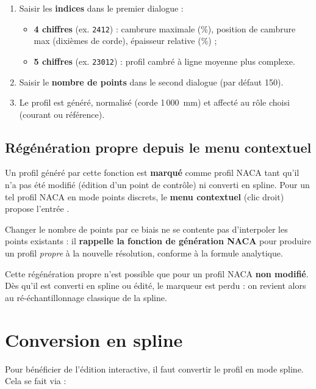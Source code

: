 \begin{enumerate}
    \item Saisir les \textbf{indices} dans le premier dialogue :
        \begin{itemize}
            \item \textbf{4 chiffres} (ex. \texttt{2412}) : cambrure
                maximale (\%), position de cambrure max (dixièmes de
                corde), épaisseur relative (\%) ;
            \item \textbf{5 chiffres} (ex. \texttt{23012}) : profil
                cambré à ligne moyenne plus complexe.
        \end{itemize}
    \item Saisir le \textbf{nombre de points} dans le second
        dialogue (par défaut 150).
    \item Le profil est généré, normalisé (corde 1\,000~mm) et
        affecté au rôle choisi (courant ou référence).
\end{enumerate}

\subsection{Régénération propre depuis le menu contextuel}

Un profil généré par cette fonction est \textbf{marqué} comme
profil NACA tant qu'il n'a pas été modifié (édition d'un point de
contrôle) ni converti en spline. Pour un tel profil NACA en mode
points discrets, le \textbf{menu contextuel} (clic droit) propose
l'entrée .

Changer le nombre de points par ce biais ne se contente pas
d'interpoler les points existants : il \textbf{rappelle la fonction
de génération NACA} pour produire un profil \emph{propre} à la
nouvelle résolution, conforme à la formule analytique.

\begin{noteinfo}
Cette régénération propre n'est possible que pour un profil NACA
\textbf{non modifié}. Dès qu'il est converti en spline ou édité,
le marqueur est perdu : on revient alors au ré-échantillonnage
classique de la spline.
\end{noteinfo}

\section{Conversion en spline}
\label{sec:convertspline}

Pour bénéficier de l'édition interactive, il faut convertir le
profil en mode spline. Cela se fait via :

